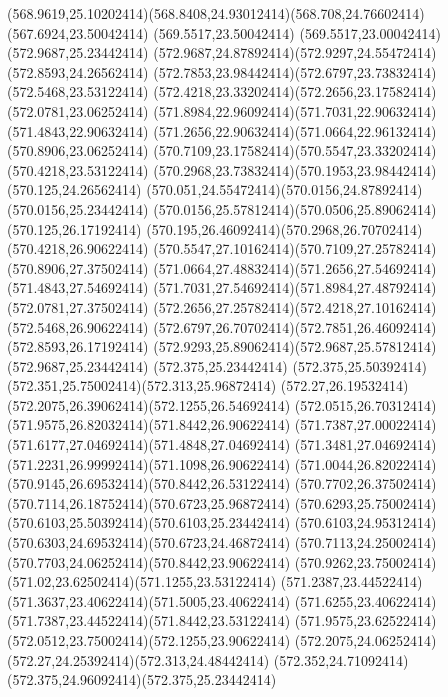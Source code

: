 {{	\curveto(568.9619,25.10202414)(568.8408,24.93012414)(568.708,24.76602414)
	\lineto(567.6924,23.50042414)
	\lineto(569.5517,23.50042414)
	\lineto(569.5517,23.00042414)
	\closepath
	\moveto(572.9687,25.23442414)
	\curveto(572.9687,24.87892414)(572.9297,24.55472414)(572.8593,24.26562414)
	\curveto(572.7853,23.98442414)(572.6797,23.73832414)(572.5468,23.53122414)
	\curveto(572.4218,23.33202414)(572.2656,23.17582414)(572.0781,23.06252414)
	\curveto(571.8984,22.96092414)(571.7031,22.90632414)(571.4843,22.90632414)
	\curveto(571.2656,22.90632414)(571.0664,22.96132414)(570.8906,23.06252414)
	\curveto(570.7109,23.17582414)(570.5547,23.33202414)(570.4218,23.53122414)
	\curveto(570.2968,23.73832414)(570.1953,23.98442414)(570.125,24.26562414)
	\curveto(570.051,24.55472414)(570.0156,24.87892414)(570.0156,25.23442414)
	\curveto(570.0156,25.57812414)(570.0506,25.89062414)(570.125,26.17192414)
	\curveto(570.195,26.46092414)(570.2968,26.70702414)(570.4218,26.90622414)
	\curveto(570.5547,27.10162414)(570.7109,27.25782414)(570.8906,27.37502414)
	\curveto(571.0664,27.48832414)(571.2656,27.54692414)(571.4843,27.54692414)
	\curveto(571.7031,27.54692414)(571.8984,27.48792414)(572.0781,27.37502414)
	\curveto(572.2656,27.25782414)(572.4218,27.10162414)(572.5468,26.90622414)
	\curveto(572.6797,26.70702414)(572.7851,26.46092414)(572.8593,26.17192414)
	\curveto(572.9293,25.89062414)(572.9687,25.57812414)(572.9687,25.23442414)
	\closepath
	\moveto(572.375,25.23442414)
	\curveto(572.375,25.50392414)(572.351,25.75002414)(572.313,25.96872414)
	\curveto(572.27,26.19532414)(572.2075,26.39062414)(572.1255,26.54692414)
	\curveto(572.0515,26.70312414)(571.9575,26.82032414)(571.8442,26.90622414)
	\curveto(571.7387,27.00022414)(571.6177,27.04692414)(571.4848,27.04692414)
	\curveto(571.3481,27.04692414)(571.2231,26.99992414)(571.1098,26.90622414)
	\curveto(571.0044,26.82022414)(570.9145,26.69532414)(570.8442,26.53122414)
	\curveto(570.7702,26.37502414)(570.7114,26.18752414)(570.6723,25.96872414)
	\curveto(570.6293,25.75002414)(570.6103,25.50392414)(570.6103,25.23442414)
	\curveto(570.6103,24.95312414)(570.6303,24.69532414)(570.6723,24.46872414)
	\curveto(570.7113,24.25002414)(570.7703,24.06252414)(570.8442,23.90622414)
	\curveto(570.9262,23.75002414)(571.02,23.62502414)(571.1255,23.53122414)
	\curveto(571.2387,23.44522414)(571.3637,23.40622414)(571.5005,23.40622414)
	\curveto(571.6255,23.40622414)(571.7387,23.44522414)(571.8442,23.53122414)
	\curveto(571.9575,23.62522414)(572.0512,23.75002414)(572.1255,23.90622414)
	\curveto(572.2075,24.06252414)(572.27,24.25392414)(572.313,24.48442414)
	\curveto(572.352,24.71092414)(572.375,24.96092414)(572.375,25.23442414)
}}
